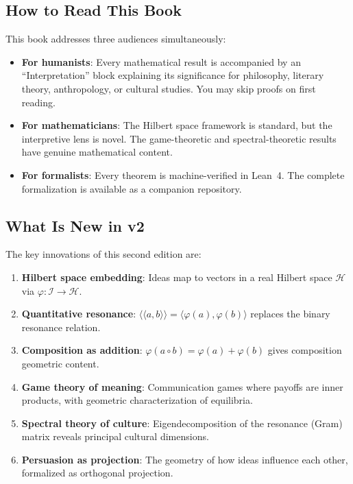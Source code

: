 \documentclass[11pt,openany]{book}
\theoremstyle{definition}
\theoremstyle{plain}
\theoremstyle{remark}
\newcommand{\IS}{\mathcal{I}}               %
\newcommand{\compose}{\circ}                 %
\newcommand{\Hspace}{\mathcal{H}}            %
\newcommand{\embed}[1]{\varphi(#1)}          %
\newcommand{\rs}[2]{\langle\!\langle #1, #2 \rangle\!\rangle}  %
\newcommand{\ip}[2]{\langle #1, #2 \rangle}  %
\begin{document}
\subsection*{How to Read This Book}

This book addresses three audiences simultaneously:

\begin{itemize}
\item \textbf{For humanists}: Every mathematical result is accompanied by an
``Interpretation'' block explaining its significance for philosophy, literary
theory, anthropology, or cultural studies. You may skip proofs on first reading.

\item \textbf{For mathematicians}: The Hilbert space framework is standard, but
the interpretive lens is novel. The game-theoretic and spectral-theoretic
results have genuine mathematical content.

\item \textbf{For formalists}: Every theorem is machine-verified in Lean~4. The
complete formalization is available as a companion repository.
\end{itemize}

\subsection*{What Is New in v2}

The key innovations of this second edition are:

\begin{enumerate}
\item \textbf{Hilbert space embedding}: Ideas map to vectors in a real Hilbert
space $\Hspace$ via $\varphi : \IS \to \Hspace$.

\item \textbf{Quantitative resonance}: $\rs{a}{b} = \ip{\embed{a}}{\embed{b}}$
replaces the binary resonance relation.

\item \textbf{Composition as addition}: $\embed{a \compose b} = \embed{a} +
\embed{b}$ gives composition geometric content.

\item \textbf{Game theory of meaning}: Communication games where payoffs are
inner products, with geometric characterization of equilibria.

\item \textbf{Spectral theory of culture}: Eigendecomposition of the resonance
(Gram) matrix reveals principal cultural dimensions.

\item \textbf{Persuasion as projection}: The geometry of how ideas influence
each other, formalized as orthogonal projection.
\end{enumerate}
\end{document}

